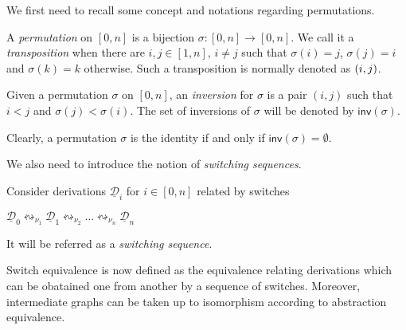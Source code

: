 \documentclass[a4paper,UKenglish,cleveref,pdftex,thm-restate,numberwithinsect,anonymous]{lipics}
\newcommand{\interval}[2][1]{\ensuremath{[{#1},{#2}]}}
\newcommand{\perm}{\sigma}
\newcommand{\dder}[1]{\mathscr{#1}}
\newcommand{\der}[1]{\underline{\dder{#1}}}
\newcommand{\inv}[1]{\mathsf{inv}({#1})}
\newcommand{\shift}[1]{\ensuremath{\mathrel{{\leftrightsquigarrow}_{#1}}}}
\begin{document}
We first need to recall some concept and notations regarding permutations. 

\begin{definition}
  A \emph{permutation} on
  $\interval[0]{n}$ is a bijection
  $\sigma : \interval[0]{n} \to \interval[0]{n}$. We call it a
  \emph{transposition} when there are $i, j \in \interval{n}$,
  $i \neq j$ such that $\sigma(i)=j$, $\sigma(j) = i$ and
  $\sigma(k) = k$ otherwise. Such a transposition is normally denoted as
  $\transp{i}[j]$.
  
  Given a permutation $\perm$ on $\interval[0]{n}$, an
  \emph{inversion} for $\sigma$ is a pair $(i,j)$ such that $i<j$ and
  $\sigma(j)< \sigma(i)$. The set of inversions of $\perm$ will be
  denoted by $\inv{\sigma}$.
\end{definition}

\begin{remark}
  Clearly, a permutation $\perm$ is the identity if and only if
  $\inv{\perm}=\emptyset$.
\end{remark}



We also need to introduce the notion of \emph{switching sequences}.


\begin{definition}
  Consider derivations $\der{D}_i$ for $i \in \interval[0]{n}$
  related by switches
  \begin{center}
    $\der{D}_0 \shift{\nu_1} \der{D}_1 \shift{\nu_2} \ldots \shift{\nu_n}
    \der{D}_n$
  \end{center}
  It will be referred as a \emph{switching sequence}.  
\end{definition}

Switch equivalence is now defined as the equivalence relating derivations which can be obatained one from another by a sequence of switches. Moreover, intermediate graphs can be taken up to isomorphism according to abstraction equivalence.
\end{document}
